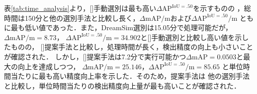 \documentclass[Japanese]{dicomopapers}
\begin{document}
  \begin{table}[tb]
    \centering
    \caption{選別手法ごとの検出精度と処理時間}
    \label{tab:time_analysis}
  \end{table}

  表\ref{tab:time_analysis}より，[]手動選別は最も高い\(\Delta\mathrm{AP}^{\mathrm{IoU}=.50}\)を示すものの
  ，総時間は150分と他の選別手法と比較し長く，\(\Delta\mathrm{mAP}/\mathrm{m}\)および\(\Delta\mathrm{AP}^{\mathrm{IoU}=.50}/\mathrm{m}\)
  ともに最も低い値であった．また，DreamSim選別は15.05分で処理可能だが，\(\Delta\mathrm{mAP}/\mathrm{m}=8.73\)，
  \(\Delta\mathrm{AP}^{\mathrm{IoU}=.50}/\mathrm{m}=34.902\)と[]手動選別と比較し高い値を示したものの，
  []提案手法と比較し，処理時間が長く，検出精度の向上も小さいことが確認された．
  しかし，[]提案手法は7.2分で実行可能かつ\(\Delta\mathrm{mAP}=0.0503\)と最大の向上を達成しつつ，
  \(\Delta\mathrm{mAP}/\mathrm{m}=25.146\)，\(\Delta\mathrm{AP}^{\mathrm{IoU}=.50}/\mathrm{m}=85.65\)
  と単位時間当たりに最も高い精度向上率を示した．そのため，提案手法は
  他の選別手法と比較し，単位時間当たりの検出精度向上量が最も高いことが確認された．
\end{document}
